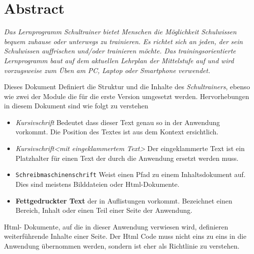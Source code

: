 \chapter{ Abstract }
\label{cha:abstract}
\emph{Das Lernprogramm \emph{Schultrainer} bietet Menschen die Möglichkeit Schulwissen
bequem zuhause oder unterwegs zu trainieren.
Es richtet sich an jeden, der sein Schulwissen auffrischen
und/oder trainieren möchte. Das trainingsorientierte Lernprogramm baut auf dem
aktuellen Lehrplan der Mittelstufe auf und wird vorzugsweise zum Üben am PC,
Laptop oder Smartphone verwendet.}

\vfill
Dieses Dokument Definiert die Struktur und die Inhalte des \emph{Schultrainers}, ebenso wie zwei der Module die für die erste Version umgesetzt werden. Hervorhebungen in diesem Dokument sind wie folgt zu verstehen
\begin{itemize}
  \item \emph{Kursivschrift} Bedeutet dass dieser Text genau so in der Anwendung vorkommt. Die Position des Textes ist aus dem Kontext ersichtlich.
  \item \emph{Kursivschrift<mit eingeklammertem Text>} Der eingeklammerte Text ist ein Platzhalter für einen Text der durch die Anwendung ersetzt werden muss.
 \item \texttt{Schreibmaschinenschrift} Weist einen Pfad zu einem Inhaltsdokument auf. Dies sind meistens Bilddateien oder Html-Dokumente. 
 \item \textbf{Fettgedruckter Text} der in Auflistungen vorkommt. Bezeichnet einen Bereich, Inhalt oder einen Teil einer Seite der Anwendung.
\end{itemize}
Html- Dokumente, auf die in dieser Anwendung verwiesen wird, definieren weiterführende Inhalte einer Seite. 
Der Html Code muss nicht eins zu eins in die Anwendung übernommen werden, sondern ist eher als Richtlinie zu verstehen.
